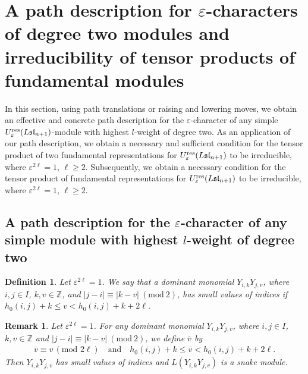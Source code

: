 \documentclass[12pt, reqno]{amsart}
\newtheorem{definition}[theorem]{Definition}
\newtheorem{remark}[theorem]{Remark}
\numberwithin{equation}{section}
\newcommand{\ZZ}{\mathbb{Z}}
\newcommand{\res}{{\rm res}}
\begin{document}
{\section{\texorpdfstring{A path description for $\varepsilon$-characters of degree two modules and irreducibility of tensor products of fundamental modules}{A path description for epsilon-characters of degree two modules and irreducibility of tensor products of fundamental modules}}\label{section of path description of degree two}

In this section, using path translations or raising and lowering moves, we obtain an effective and concrete path description for the $\varepsilon$-character of any simple $U_{\varepsilon}^{\res}({L\mathfrak{sl}_{n+1}})$-module with highest $l$-weight of degree two. As an application of our path description, we obtain a necessary and sufficient condition for the tensor product of two fundamental representations for $U_{\varepsilon}^{\res}({L\mathfrak{sl}_{n+1}})$ to be irreducible, where $\varepsilon^{2 \ell}=1$, $\ell \geq 2$. Subsequently, we obtain a necessary condition for the tensor product of fundamental representations for $U_{\varepsilon}^{\res}({L\mathfrak{sl}_{n+1}})$ to be irreducible, where $\varepsilon^{2 \ell}=1$, $\ell \geq 2$.

\subsection{\texorpdfstring{A path description for the $\varepsilon$-character of any simple module with highest $l$-weight of degree two}{A path description for the epsilon-character of any simple module with highest l-weight of degree two}}\label{subsection of path description of degree two}
\begin{definition} \label{def:small values of indices}
Let $\varepsilon^{2 \ell}=1$. We say that a dominant monomial $Y_{i,k}Y_{j,v}$, where $i,j \in I$, $k, v\in \ZZ$, and $|j-i|\equiv |k-v|\ (\text{mod}\ 2)$, has small values of indices if $h_0(i,j)+k\leq v<h_0(i,j)+k+2 \ell$.
\end{definition}

\begin{remark} \label{remark:any degree 2 monomial satisfying certain condition can be converted to small value indices}
Let $\varepsilon^{2 \ell}=1$. For any dominant monomial $Y_{i,k}Y_{j,v}$, where $i,j \in I$, $k,v\in \ZZ$ and $|j-i|\equiv |k-v|\ (\text{mod}\ 2)$, we define $\overline{v}$ by
\begin{align}\label{Eq:small index}
\overline{v}\equiv v\,(\text{mod } 2 \ell)\quad \text{and}\quad h_0(i,j)+k\leq \overline{v}<h_0(i,j)+k+2 \ell.
\end{align}
Then $Y_{i,k}Y_{j,\overline{v}}$ has small values of indices and $L(Y_{i,k}Y_{j,\overline{v}})$ is a snake module.
\end{remark}

}
\end{document}
